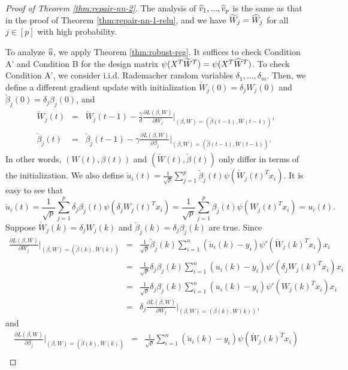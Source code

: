 \begin{proof}[Proof of Theorem \ref{thm:repair-nn-2}]
The analysis of $\widehat{v}_1,...,\widehat{v}_p$ is the same as that in the proof of Theorem \ref{thm:repair-nn-1-relu}, and we have $\widetilde{W}_j=\widehat{W}_j$ for all $j\in[p]$ with high probability.

To analyze $\widehat{u}$, we apply Theorem \ref{thm:robust-reg}. It suffices to check Condition A' and Condition B for the design matrix $\psi(X^T\widetilde{W}^T)=\psi(X^T\widehat{W}^T)$. To check Condition A', we consider i.i.d. Rademacher random variables $\delta_1,...,\delta_m$. Then, we define a different gradient update with initialization $\check{W}_j(0)=\delta_jW_j(0)$ and $\check{\beta}_j(0)=\delta_j\beta_j(0)$, and
\begin{eqnarray*}
\check{W}_j(t) &=& \check{W}_j(t-1) - \frac{\gamma}{d}\frac{\partial L(\beta,W)}{\partial W_j}|_{(\beta,W)=(\check{\beta}(t-1),\check{W}(t-1))}, \\
\check{\beta}_j(t) &=& \check{\beta}_j(t-1) - \gamma\frac{\partial L(\beta,W)}{\partial \beta_j}|_{(\beta,W)=(\check{\beta}(t-1),\check{W}(t-1))}.
\end{eqnarray*}
In other words, $(W(t),\beta(t))$ and $(\check{W}(t),\check{\beta}(t))$ only differ in terms of the initialization. We also define $\check{u}_i(t)=\frac{1}{\sqrt{p}}\sum_{j=1}^p\check{\beta}_j(t)\psi(\check{W}_j(t)^Tx_i)$. It is easy to see that
$$\check{u}_i(t)=\frac{1}{\sqrt{p}}\sum_{j=1}^p\delta_j\beta_j(t)\psi(\delta_jW_j(t)^Tx_i)=\frac{1}{\sqrt{p}}\sum_{j=1}^p\beta_j(t)\psi(W_j(t)^Tx_i)=u_i(t).$$
Suppose $\check{W}_j(k)=\delta_jW_j(k)$ and $\check{\beta}_j(k)=\delta_j\beta_j(k)$ are true. Since
\begin{eqnarray*}
\frac{\partial L(\beta,W)}{\partial W_j}|_{(\beta,W)=(\check{\beta}(k),\check{W}(k))} &=& \frac{1}{\sqrt{p}}\check{\beta}_j(k)\sum_{i=1}^n(\check{u}_i(k)-y_i)\psi'(\check{W}_j(k)^Tx_i)x_i \\
&=& \frac{1}{\sqrt{p}}\delta_j{\beta}_j(k)\sum_{i=1}^n({u}_i(k)-y_i)\psi'(\delta_j{W}_j(k)^Tx_i)x_i \\
&=& \frac{1}{\sqrt{p}}\delta_j{\beta}_j(k)\sum_{i=1}^n({u}_i(k)-y_i)\psi'({W}_j(k)^Tx_i)x_i \\
&=& \delta_j\frac{\partial L(\beta,W)}{\partial W_j}|_{(\beta,W)=({\beta}(k),{W}(k))},
\end{eqnarray*}
and
\begin{eqnarray*}
\frac{\partial L(\beta,W)}{\partial \beta_j}|_{(\beta,W)=(\check{\beta}(k),\check{W}(k))} &=& \frac{1}{\sqrt{p}}\sum_{i=1}^n(\check{u}_i(k)-y_i)\psi(\check{W}_j(k)^Tx_i) \\

\end{eqnarray*}
\end{proof}
